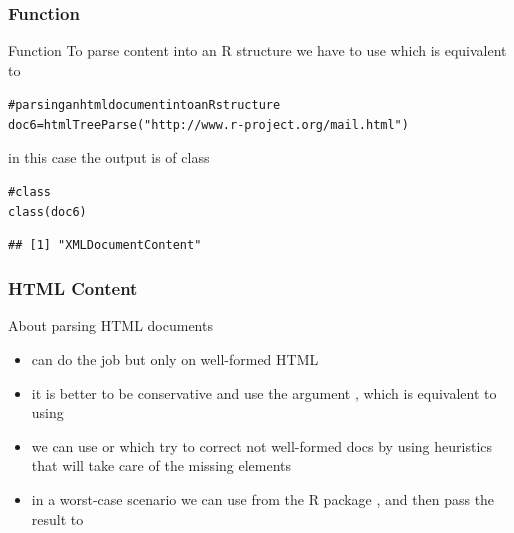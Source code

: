 \documentclass{beamer}\usepackage[]{graphicx}\usepackage[]{color}
\makeatletter
\newcommand{\hlstr}[1]{\textcolor[rgb]{0.063,0.58,0.627}{#1}}%
\newcommand{\hlcom}[1]{\textcolor[rgb]{0.588,0.588,0.588}{#1}}%
\newcommand{\hlstd}[1]{\textcolor[rgb]{0.196,0.196,0.196}{#1}}%
\newcommand{\hlkwb}[1]{\textcolor[rgb]{0.627,0,0.314}{#1}}%
\newcommand{\hlkwd}[1]{\textcolor[rgb]{0.78,0.227,0.412}{#1}}%
\newenvironment{kframe}{%
 \def\at@end@of@kframe{}%
 \ifinner\ifhmode%
  \def\at@end@of@kframe{\end{minipage}}%
  \begin{minipage}{\columnwidth}%
 \fi\fi%
 \def\FrameCommand##1{\hskip\@totalleftmargin \hskip-\fboxsep
 \colorbox{shadecolor}{##1}\hskip-\fboxsep
     \hskip-\linewidth \hskip-\@totalleftmargin \hskip\columnwidth}%
 \MakeFramed {\advance\hsize-\width
   \@totalleftmargin\z@ \linewidth\hsize
   \@setminipage}}%
 {\par\unskip\endMakeFramed%
 \at@end@of@kframe}
\newenvironment{knitrout}{}{} %
\makeatother
\begin{document}
\begin{frame}[fragile]
\frametitle{Function }

\begin{block}{Function }
To parse content into an R structure we have to use  which is equivalent to 

\begin{knitrout}\tiny
{}\color{fgcolor}\begin{kframe}
\begin{alltt}
\hlcom{# parsing an html document into an  R structure}
\hlstd{doc6} \hlkwb{=} \hlkwd{htmlTreeParse}\hlstd{(}\hlstr{"http://www.r-project.org/mail.html"}\hlstd{)}
\end{alltt}
\end{kframe}
\end{knitrout}

in this case the output is of class 

\begin{knitrout}\tiny
{}\color{fgcolor}\begin{kframe}
\begin{alltt}
\hlcom{# class }
\hlkwd{class}\hlstd{(doc6)}
\end{alltt}
\begin{verbatim}
## [1] "XMLDocumentContent"
\end{verbatim}
\end{kframe}
\end{knitrout}
\end{block}

\end{frame}


\begin{frame}[fragile]
\frametitle{HTML Content}

\begin{block}{About parsing HTML documents}
\begin{itemize}
 \item {} can do the job but only on well-formed HTML
 \item it is better to be conservative and use the argument , which is equivalent to using 
 \item we can use  or  which try to correct not well-formed docs by using heuristics that will take care of the missing elements
 \item in a worst-case scenario we can use  from the R package , and then pass the result to 
\end{itemize}
\end{block}

\end{frame}
\end{document}
